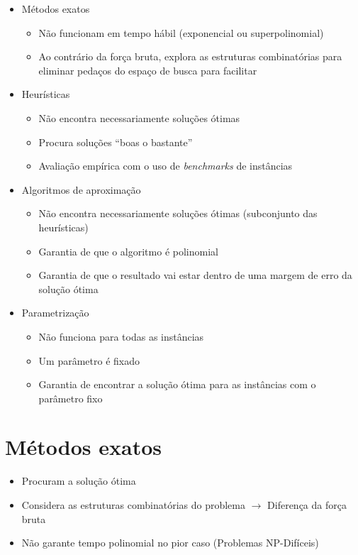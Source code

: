 \begin{itemize}
    \item Métodos exatos
          \begin{itemize}
              \item Não funcionam em tempo hábil (exponencial ou superpolinomial)
              \item Ao contrário da força bruta, explora as estruturas combinatórias para eliminar pedaços do espaço de busca para facilitar
          \end{itemize}
    \item Heurísticas
          \begin{itemize}
              \item Não encontra necessariamente soluções ótimas
              \item Procura soluções ``boas o bastante''
              \item Avaliação empírica com o uso de \textit{benchmarks} de instâncias
          \end{itemize}
    \item Algoritmos de aproximação
          \begin{itemize}
              \item Não encontra necessariamente soluções ótimas (subconjunto das heurísticas)
              \item Garantia de que o algoritmo é polinomial
              \item Garantia de que o resultado vai estar dentro de uma margem de erro da solução ótima
          \end{itemize}
    \item Parametrização
          \begin{itemize}
              \item Não funciona para todas as instâncias
              \item Um parâmetro é fixado
              \item Garantia de encontrar a solução ótima para as instâncias com o parâmetro fixo
          \end{itemize}
\end{itemize}

\section{Métodos exatos}

\begin{itemize}
    \item Procuram a solução ótima
    \item Considera as estruturas combinatórias do problema $\to$ Diferença da força bruta
    \item Não garante tempo polinomial no pior caso (Problemas NP-Difíceis)
\end{itemize}


